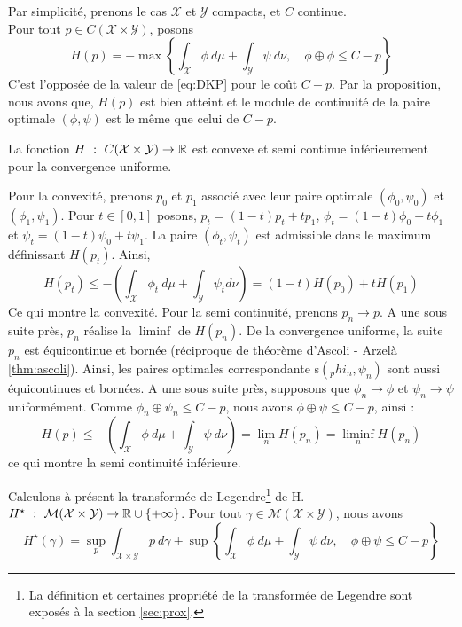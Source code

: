 \documentclass[a4paper,12pt]{article}
\begin{document}
\begin{preuve}
Par simplicité, prenons le cas $\mathcal{X}$ et $\mathcal{Y}$ compacts, et $C$ continue.\\
Pour tout $p\in C(\mathcal{X}\times\mathcal{Y})$, posons 
$$
H(p) = -\max\left\{\int_{\mathcal{X}} \phi\ d\mu +\int_{\mathcal{Y}} \psi\ d\nu, \quad \phi\oplus\phi\leq C-p\right\}
$$
C'est l'opposée de la valeur de \eqref{eq:DKP} pour le coût $C-p$. Par la proposition, nous avons que, $H(p)$ est bien atteint et le module de continuité de la paire optimale $(\phi,\psi)$ est le même que celui de $C-p$. 
\begin{lemme}
La fonction $H\ :\ C(\mathcal{X}\times\mathcal{Y})\rightarrow\RR$ est convexe et semi continue inférieurement pour la convergence uniforme.
\end{lemme}
\begin{preuve}
Pour la convexité, prenons $p_0$ et $p_1$ associé avec leur paire optimale $(\phi_0,\psi_0)$ et $(\phi_1,\psi_1)$. Pour $t\in [0,1]$ posons, $p_t=(1-t)p_t+tp_1$, $\phi_t=(1-t)\phi_0 + t\phi_1$ et $\psi_t=(1-t)\psi_0+t\psi_1$. La paire $(\phi_t,\psi_t)$ est admissible dans le maximum définissant $H(p_t)$. Ainsi, 
$$
H(p_t)\leq-\left(\int_{\mathcal{X}}\phi_t\ d\mu+\int_{\mathcal{Y}}\psi_t d\nu\right) = (1-t)H(p_0)+tH(p_1)
$$
Ce qui montre la convexité. Pour la semi continuité, prenons $p_n\rightarrow p$. A une sous suite près, $p_n$ réalise la $\liminf$ de $H(p_n)$. De la convergence uniforme, la suite $p_n$ est équicontinue et bornée (réciproque de théorème d'Ascoli - Arzelà \eqref{thm:ascoli}). Ainsi, les paires optimales correspondante s$(_phi_n,\psi_n)$ sont aussi équicontinues et bornées. A une sous suite près, supposons que $\phi_n\rightarrow\phi$ et $\psi_n\rightarrow\psi$ uniformément. Comme $\phi_n\oplus\psi_n\leq C-p$, nous avons $\phi\oplus\psi\leq C-p$, ainsi :
$$
H(p) \leq - \left(\int_{\mathcal{X}}\phi\ d\mu+\int_{\mathcal{Y}}\psi\ d\nu\right) = \lim_n H(p_n)=\liminf_n H(p_n)
$$
ce qui montre la semi continuité inférieure.
\end{preuve}
Calculons à présent la transformée de Legendre\footnote{La définition et certaines propriété de la transformée de Legendre sont exposés à la section \ref{sec:prox}.} de H. $H^{\star}\ :\ \mathcal{M}(\mathcal{X}\times\mathcal{Y})\rightarrow\RR\cup\{+\infty\}$. Pour tout $\gamma\in\mathcal{M}(\mathcal{X}\times\mathcal{Y})$, nous avons 
$$
H^{\star}(\gamma)= \sup_p \int_{\mathcal{X}\times\mathcal{Y}} p\ d\gamma + \sup \left\{ \int_{\mathcal{X}}\phi\ d\mu + \int_{\mathcal{Y}}\psi\ d\nu, \quad \phi\oplus\psi\leq C- p \right\}
$$
\end{preuve}
\end{document}
